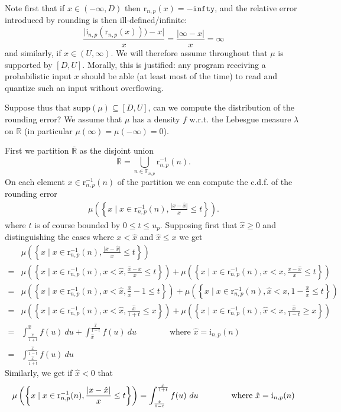 \documentclass[10pt,a4paper]{article}
\theoremstyle{plain}
\theoremstyle{definition}
\newcommand{\F}[1][n,p]{\mathbb{F}_{#1}}
\newcommand{\R}{\mathbb{R}}
\newcommand{\eR}{\overline{\R}}
\newcommand{\Rep}[1][n,p]{\mathrm{i}_{#1}}
\newcommand{\Round}[1][n,p]{\mathrm{r}_{#1}}
\newcommand{\inv}{^{-1}}
\newcommand{\absv}[1]{\vert #1\vert}
\newcommand{\uro}[1][p]{u_{#1}}
\newcommand{\supp}{\mathrm{supp}}
\begin{document}
Note first that if $x\in (-\infty,D)$ then $\Round(x)=-\mathtt{infty}$, and the relative error introduced by rounding is then ill-defined/infinite:
\[
\frac{\absv{\Rep(\Round(x)))-x}}{x}=\frac{\absv{\infty-x}}{x}=\infty
\]
and similarly, if $x\in (U,\infty)$. We will therefore assume throughout that $\mu$ is supported by $[D,U]$. Morally, this is justified: any program receiving a probabilistic input $x$ should be able (at least most of the time) to read and quantize such an input without overflowing. 

Suppose thus that $\supp(\mu)\subseteq [D,U]$, can we compute the distribution of the rounding error? We assume that $\mu$ has a density $f$ w.r.t. the Lebesgue measure $\lambda$ on $\R$ (in particular $\mu(\infty)=\mu(-\infty)=0$).

First we partition $\eR$ as the disjoint union
\[
\eR=\bigcup_{n\in \F}\Round\inv(n).
\]
On each element $x\in\Round\inv(n)$ of the partition we can compute the c.d.f. of the rounding error 
\begin{align*}
\mu\left(\left\{x\mid  x\in\Round\inv(n), \frac{\absv{x-\hat{x}}}{x}\leq t\right\}\right).
\end{align*}
where $t$ is of course bounded by $0\leq t\leq \uro$.
Supposing first that $\hat{x}\geq 0$ and distinguishing the cases where $x<\hat{x}$ and $\hat{x}\leq x$ we get
\begin{align*}
&\mu\left(\left\{x\mid  x\in\Round\inv(n), \frac{\absv{x-\hat{x}}}{x}\leq t\right\}\right)\\
=&\mu\left(\left\{x\mid x\in\Round\inv(n), x<\hat{x}, \frac{\hat{x}-x}{x}\leq t\right\}\right)+\mu\left(\left\{x\mid x\in\Round\inv(n), \hat{x}<x, \frac{x-\hat{x}}{x}\leq t\right\}\right)\\
=&\mu\left(\left\{x\mid x\in\Round\inv(n), x<\hat{x}, \frac{\hat{x}}{x}-1\leq t\right\}\right)+\mu\left(\left\{x\mid x\in\Round\inv(n), \hat{x}<x, 1-\frac{\hat{x}}{x}\leq t\right\}\right)\\
=&\mu\left(\left\{x\mid x\in\Round\inv(n), x<\hat{x}, \frac{\hat{x}}{1+t}\leq x\right\}\right)+\mu\left(\left\{x\mid x\in\Round\inv(n), \hat{x}<x, \frac{\hat{x}}{1-t}\geq x\right\}\right)\\
=&\int_{\frac{\hat{x}}{1+t}}^{\hat{x}} f(u)~du+\int_{\hat{x}}^{\frac{\hat{x}}{1-t}}f(u)~du\qquad\qquad\text{where }\hat{x}=\Rep(n)\\
=&\int_{\frac{\hat{x}}{1+t}}^{\frac{\hat{x}}{1-t}}f(u)~du
\end{align*}
Similarly, we get if $\hat{x}<0$ that
\[
\mu\left(\left\{x\mid x\in\Round\inv(n), \frac{\absv{x-\hat{x}}}{x}\leq t\right\}\right)=\int^{\frac{\hat{x}}{1+t}}_{\frac{\hat{x}}{1-t}}f(u)~du\qquad\qquad\text{where }\hat{x}=\Rep(n)\\
\]
\end{document}

